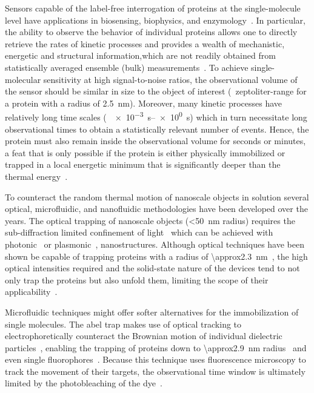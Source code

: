 Sensors capable of the label-free interrogation of proteins at the single-molecule level have applications in
biosensing, biophysics, and enzymology~\cite{Gooding-2016,Xie-2001,Willems-VanMeervelt-2017}. In particular,
the ability to observe the behavior of individual proteins allows one to directly retrieve the rates of
kinetic processes and provides a wealth of mechanistic, energetic and structural information,which are not
readily obtained from statistically averaged ensemble (bulk) measurements~\cite{Goodinng-2016}. To achieve
single-molecular sensitivity at high signal-to-noise ratios, the observational volume of the sensor should be
similar in size to the object of interest (\ie~zeptoliter-range for a protein with a radius of \SI{2.5}{\nm}).
Moreover, many kinetic processes have relatively long time scales (\eg~\SIrange{e-3}{e0}{\second}) which in
turn necessitate long observational times to obtain a statistically relevant number of events. Hence, the
protein must also remain inside the observational volume for seconds or minutes, a feat that is only possible
if the protein is either physically immobilized or trapped in a local energetic minimum that is significantly
deeper than the thermal energy~\cite{Krishnan-2010,Myers-2015}.

To counteract the random thermal motion of nanoscale objects in solution several optical, microfluidic, and
nanofluidic methodologies have been developed over the years. The optical trapping of nanoscale objects
(\SI{<50}{\nm} radius) requires the sub-diffraction limited confinement of light~\cite{Neuman-2004,Baker-2017,
Bradac-2018} which can be achieved with photonic~\cite{Yang-2009,Mandal-2010} or
plasmonic~\cite{Juan-2009,Chen-2011,
Pang-2011,Bergeron-2013,Kotnala-2014,Kerman-2015,Chen-2018,Verschueren-2019}, nanostructures. Although optical
techniques have been shown be capable of trapping proteins with a radius of
\SI{\approx2.3}{\nm}~\cite{Kotnala-2014}, the high optical intensities required and the solid-state nature of
the devices tend to not only trap the proteins but also unfold them, limiting the scope of their
applicability~\cite{Pang-2011, Verschueren-2019}.

Microfluidic techniques might offer softer alternatives for the immobilization of single molecules. The
\gls{abel} trap makes use of optical tracking to electrophoretically counteract the Brownian motion of
individual dielectric particles~\cite{Cohen-2005,Cohen-2006,Goldsmith-2010, Goldsmith-2011}, enabling the
trapping of proteins down to \SI{\approx2.9}{\nm} radius~\cite{Goldsmith-2011} and even single
fluorophores~\cite{Fields-2011}. Because this technique uses fluorescence microscopy to track the movement of
their targets, the observational time window is ultimately limited by the photobleaching of the
dye~\cite{Cohen-2005,Goldsmith-2010}.

